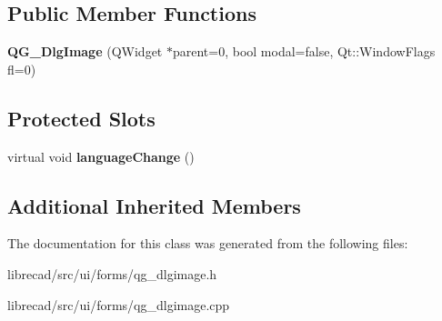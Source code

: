 \subsection*{Public Member Functions}
\begin{DoxyCompactItemize}
\item 
\hypertarget{classQG__DlgImage_a318c2223d1bd8f23b70bdeacd371769b}{{\bfseries Q\-G\-\_\-\-Dlg\-Image} (Q\-Widget $\ast$parent=0, bool modal=false, Qt\-::\-Window\-Flags fl=0)}\label{classQG__DlgImage_a318c2223d1bd8f23b70bdeacd371769b}

\end{DoxyCompactItemize}
\subsection*{Protected Slots}
\begin{DoxyCompactItemize}
\item 
\hypertarget{classQG__DlgImage_aecdeaefcf9a8f63959ac0e1feeef93bd}{virtual void {\bfseries language\-Change} ()}\label{classQG__DlgImage_aecdeaefcf9a8f63959ac0e1feeef93bd}

\end{DoxyCompactItemize}
\subsection*{Additional Inherited Members}


The documentation for this class was generated from the following files\-:\begin{DoxyCompactItemize}
\item 
librecad/src/ui/forms/qg\-\_\-dlgimage.\-h\item 
librecad/src/ui/forms/qg\-\_\-dlgimage.\-cpp\end{DoxyCompactItemize}
